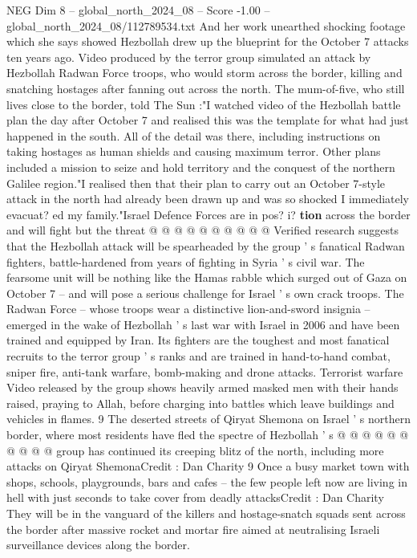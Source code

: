 \begin{textsample}{NEG Dim 8 – global\_north\_2024\_08 – Score -1.00 – global\_north\_2024\_08/112789534.txt}  \label{ex:f8_neg_121}
And her work unearthed shocking footage which she says showed Hezbollah drew up the blueprint for the October 7 attacks ten years ago.
Video produced by the terror group simulated an attack by Hezbollah Radwan Force troops, who would storm across the border, killing and snatching hostages after fanning out across the north.
The mum-of-five, who still lives close to the border, told The Sun :"I watched video of the Hezbollah battle plan the day after October 7 and realised this was the template for what had just happened in the south.
All of the detail was there, including instructions on taking hostages as human shields and causing maximum terror.
Other plans included a mission to seize and hold territory and the conquest of the northern Galilee region."I realised then that their plan to carry out an October 7-style attack in the north had already been drawn up and was so shocked I immediately evacuat? ed my family."Israel Defence Forces are in pos? i? \textbf{tion} across the border and will fight but the threat @ @ @ @ @ @ @ @ @ @ Verified research suggests that the Hezbollah attack will be spearheaded by the group ' s fanatical Radwan fighters, battle-hardened from years of fighting in Syria ' s civil war.
The fearsome unit will be nothing like the Hamas rabble which surged out of Gaza on October 7 -- and will pose a serious challenge for Israel ' s own crack troops.
The Radwan Force -- whose troops wear a distinctive lion-and-sword insignia -- emerged in the wake of Hezbollah ' s last war with Israel in 2006 and have been trained and equipped by Iran.
Its fighters are the toughest and most fanatical recruits to the terror group ' s ranks and are trained in hand-to-hand combat, sniper fire, anti-tank warfare, bomb-making and drone attacks.
Terrorist warfare Video released by the group shows heavily armed masked men with their hands raised, praying to Allah, before charging into battles which leave buildings and vehicles in flames. 9 The deserted streets of Qiryat Shemona on Israel ' s northern border, where most residents have fled the spectre of Hezbollah ' s @ @ @ @ @ @ @ @ @ @ group has continued its creeping blitz of the north, including more attacks on Qiryat ShemonaCredit : Dan Charity 9 Once a busy market town with shops, schools, playgrounds, bars and cafes -- the few people left now are living in hell with just seconds to take cover from deadly attacksCredit : Dan Charity They will be in the vanguard of the killers and hostage-snatch squads sent across the border after massive rocket and mortar fire aimed at neutralising Israeli surveillance devices along the border.

\end{textsample}
